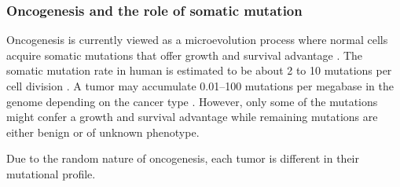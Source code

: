 \subsubsection{Oncogenesis and the role of somatic mutation}
Oncogenesis is currently viewed as a microevolution process where normal cells acquire somatic mutations that offer growth and survival advantage \cite{strattonmr_futrealpa:CancerGenome2009,martincorenai_campbellpj:SomaticMutation2015}. The somatic mutation rate in human is estimated to be about 2 to 10 mutations per cell division \cite{lynchm_lynchm:RateMolecular2010,milhollandb_vijgj:DifferencesGermline2017}. A tumor may accumulate 0.01--100 mutations per megabase in the genome depending on the cancer type \cite{lawrencems_getzg:MutationalHeterogeneity2013,martincorenai_campbellpj:SomaticMutation2015}. However, only some of the mutations might confer a growth and survival advantage while remaining mutations are either benign or of unknown phenotype.

Due to the random nature of oncogenesis, each tumor is different in their mutational profile.




